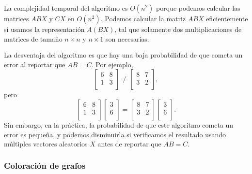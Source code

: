 La complejidad temporal del algoritmo es $O(n^2)$ porque podemos calcular
las matrices $ABX$ y $CX$ en $O(n^2)$. Podemos calcular la matriz $ABX$
eficientemente si usamos la representación $A(BX)$, tal que solamente
dos multiplicaciones de matrices de tamaño $n \times n$ y $n \times 1$
son necesarias.

La desventaja del algoritmo es que hay una baja probabilidad de que
cometa un error al reportar que $AB=C$. Por ejemplo,
\[
    \begin{bmatrix}
        6 & 8 \\
        1 & 3 \\
    \end{bmatrix}
    \neq
    \begin{bmatrix}
        8 & 7 \\
        3 & 2 \\
    \end{bmatrix},
\]
pero
\[
    \begin{bmatrix}
        6 & 8 \\
        1 & 3 \\
    \end{bmatrix}
    \begin{bmatrix}
        3 \\
        6 \\
    \end{bmatrix}
    =
    \begin{bmatrix}
        8 & 7 \\
        3 & 2 \\
    \end{bmatrix}
    \begin{bmatrix}
        3 \\
        6 \\
    \end{bmatrix}.
\]
Sin embargo, en la práctica, la probabilidad de que este algoritmo
cometa un error es pequeña, y podemos disminuirla si verificamos el
resultado usando múltiples vectores aleatorios $X$ antes de reportar que
$AB=C$.

\subsubsection{Coloración de grafos}


